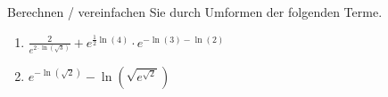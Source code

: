 \begin{ExerciseBlock}
Berechnen / vereinfachen Sie durch Umformen der folgenden Terme.
\begin{enumerate}[label=\alph*)]
\item
$\displaystyle \frac{2}{e^{2 \cdot \ln(\sqrt{3})}} + e^{\frac{1}{2} \ln(4)} \cdot e^{-\ln(3)-\ln(2)} $
\item
$\displaystyle e^{- \ln(\sqrt{2})} - \ln\left( \sqrt{e^{\sqrt{2}}} \right) $
\end{enumerate}

\end{ExerciseBlock}
